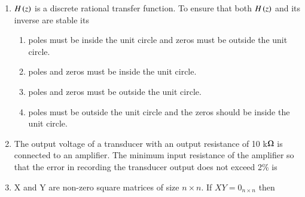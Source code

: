 \documentclass[journal,12pt,onecolumn]{IEEEtran}
\theoremstyle{remark}
\begin{document}
\begin{enumerate}
\hfill{}\begin{enumerate}  
\end{enumerate}

\item $H\left(z\right)$ is a discrete rational transfer function. To ensure that both $H\left(z\right)$ and its inverse are stable its

\hfill{}\begin{enumerate}
    \item poles must be inside the unit circle and zeros must be outside the unit circle.
    \item poles and zeros must be inside the unit circle.
    \item poles and zeros must be outside the unit circle.
    \item poles must be outside the unit circle and the zeros should be inside the unit circle.
 \end{enumerate}



\item The output voltage of a transducer with an output resistance of 10 k$\ohm$ is connected to an amplifier. The minimum input resistance of the amplifier so that the error in recording the transducer output does not exceed 2\% is

\hfill{}
\begin{enumerate}
 \end{enumerate}



\item X and Y are non-zero square matrices of size $n \times n$. If $XY=0_{n \times n}$ then

\hfill{}\begin{enumerate}  \end{enumerate}




\end{enumerate}
\end{document}
